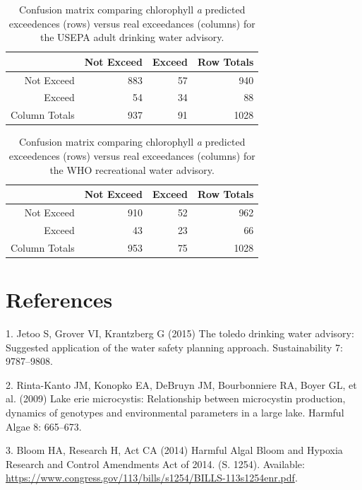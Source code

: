 \documentclass[10pt,a4paper,twocolumn]{article}
\begin{document}
\begin{table}[ht]
\caption{Confusion matrix comparing chlorophyll \textit{a} 
                     predicted exceedences (rows) versus real exceedances 
                     (columns) for the USEPA adult drinking water advisory.} 
\label{adult_conmat_table}
\begin{tabular}{rrrr}
  \hline
 & Not Exceed & Exceed & Row Totals \\ 
  \hline
Not Exceed & 883 &  57 & 940 \\ 
  Exceed &  54 &  34 &  88 \\ 
  Column Totals & 937 &  91 & 1028 \\ 
   \hline
\end{tabular}
\end{table}

\begin{table}[ht]
\caption{Confusion matrix comparing chlorophyll \textit{a} 
                     predicted exceedences (rows) versus real exceedances 
                     (columns) for the WHO recreational water advisory.} 
\label{who_rec_conmat_table}
\begin{tabular}{rrrr}
  \hline
 & Not Exceed & Exceed & Row Totals \\ 
  \hline
Not Exceed & 910 &  52 & 962 \\ 
  Exceed &  43 &  23 &  66 \\ 
  Column Totals & 953 &  75 & 1028 \\ 
   \hline
\end{tabular}
\end{table}

\twocolumn

\section*{References}\label{references}

1. Jetoo S, Grover VI, Krantzberg G (2015) The toledo drinking water
advisory: Suggested application of the water safety planning approach.
Sustainability 7: 9787--9808.

2. Rinta-Kanto JM, Konopko EA, DeBruyn JM, Bourbonniere RA, Boyer GL, et
al. (2009) Lake erie microcystis: Relationship between microcystin
production, dynamics of genotypes and environmental parameters in a
large lake. Harmful Algae 8: 665--673.

3. Bloom HA, Research H, Act CA (2014) Harmful Algal Bloom and Hypoxia
Research and Control Amendments Act of 2014. (S. 1254). Available:
\url{https://www.congress.gov/113/bills/s1254/BILLS-113s1254enr.pdf}.
\end{document}
